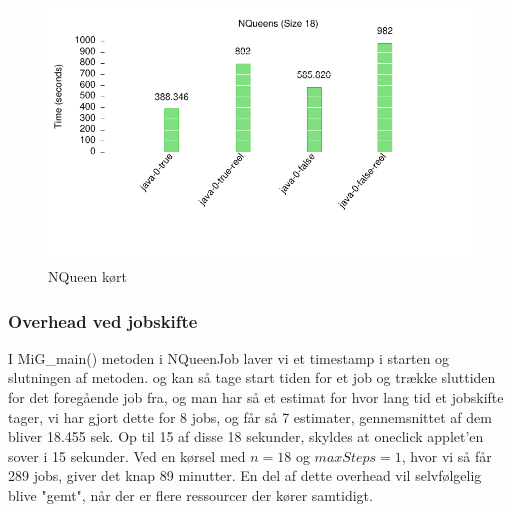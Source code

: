 
\begin{figure}[h]
\begin{center}
\includegraphics{../benchmarks/mig.pdf}
\caption{NQueen kørt \mig} 
\label{figur:mig}
\end{center}
\end{figure}



\subsubsection{Overhead ved jobskifte}

I MiG\_main() metoden i NQueenJob laver vi et timestamp i starten og slutningen
af metoden.  og kan så tage start tiden for et job og trække sluttiden for det
foregående job fra, og man har så et estimat for hvor lang tid et jobskifte
tager, vi har gjort dette for 8 jobs, og får så 7 estimater, gennemsnittet af
dem bliver 18.455 sek.  Op til 15 af disse 18 sekunder, skyldes at oneclick
applet'en sover i 15 sekunder.  Ved en kørsel med $n=18$ og $maxSteps=1$, hvor
vi så får 289 jobs, giver det knap 89 minutter. En del af dette overhead vil
selvfølgelig blive "gemt", når der er flere ressourcer der kører samtidigt.

